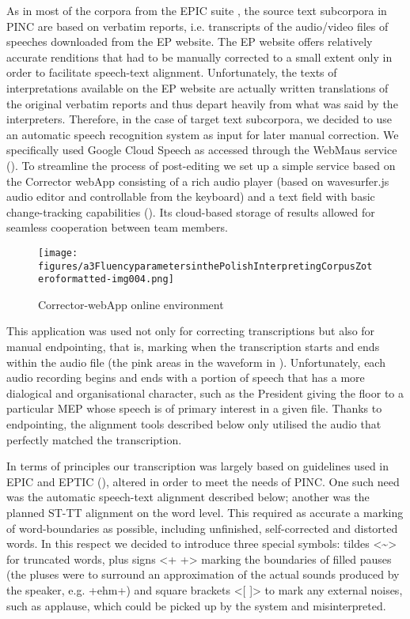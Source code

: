 \documentclass[output=paper]{langscibook}
\begin{document}
As in most of the corpora from the EPIC suite \citep{BernardiniEtAl2018}, the source text subcorpora in PINC are based on verbatim reports, i.e. transcripts of the audio/video files of speeches downloaded from the EP website. The EP website offers relatively accurate renditions that had to be manually corrected to a small extent only in order to facilitate speech-text alignment. Unfortunately, the texts of interpretations available on the EP website are actually written translations of the original verbatim reports and thus depart heavily from what was said by the interpreters. Therefore, in the case of target text subcorpora, we decided to use an automatic speech recognition system as input for later manual correction. We specifically used Google Cloud Speech as accessed through the WebMaus service (\citealt{KislerEtAl2017}). To streamline the process of post-editing we set up a simple service based on the Corrector webApp \citep{Korzinek2019} consisting of a rich audio player (based on wavesurfer.js audio editor and controllable from the keyboard) and a text field with basic change-tracking capabilities (). Its cloud-based storage of results allowed for seamless cooperation between team members.

 \begin{figure}
\texttt{[image: figures/a3FluencyparametersinthePolishInterpretingCorpusZoteroformatted-img004.png]}
 

\caption{
Corrector-webApp online environment
}
\label{fig:chmiel:4}
\end{figure}

This application was used not only for correcting transcriptions but also for manual endpointing, that is, marking when the transcription starts and ends within the audio file (the pink areas in the waveform in ). Unfortunately, each audio recording begins and ends with a portion of speech that has a more dialogical and organisational character, such as the President giving the floor to a particular MEP whose speech is of primary interest in a given file. Thanks to endpointing, the alignment tools described below only utilised the audio that perfectly matched the transcription.

In terms of principles our transcription was largely based on guidelines used in EPIC and EPTIC (\citealt[27]{BernardiniEtAl2018}), altered in order to meet the needs of PINC. One such need was the automatic speech-text alignment described below; another was the planned ST-TT alignment on the word level. This required as accurate a marking of word-boundaries as possible, including unfinished, self-corrected and distorted words. In this respect we decided to introduce three special symbols: tildes <{\textasciitilde}> for truncated words, plus signs <+ +> marking the boundaries of filled pauses (the pluses were to surround an approximation of the actual sounds produced by the speaker, e.g. +ehm+) and square brackets <[ ]> to mark any external noises, such as applause, which could be picked up by the system and misinterpreted.
\end{document}
